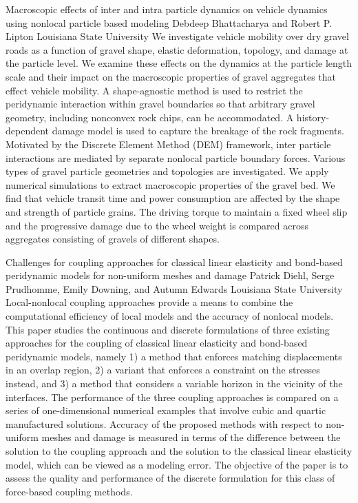 \vspace{1.5ex}
\abs
{Macroscopic effects of inter and intra particle dynamics on vehicle dynamics using nonlocal particle based modeling}
{Debdeep Bhattacharya and Robert P. Lipton}
{Louisiana State University}
{
We investigate vehicle mobility over dry gravel roads as a function of gravel shape, elastic deformation, topology, and damage at the particle level. We examine these effects on the dynamics at the particle length scale and their impact on the macroscopic properties of gravel aggregates that effect vehicle mobility.  A shape-agnostic method is used to restrict the peridynamic interaction within gravel boundaries so that arbitrary gravel geometry, including nonconvex rock chips, can be accommodated.  A history-dependent damage model is used to capture the breakage of the rock fragments.  Motivated by the Discrete Element Method (DEM) framework, inter particle interactions are mediated by separate nonlocal particle boundary forces.  Various types of gravel particle geometries and topologies are investigated. We apply numerical simulations to extract macroscopic properties of the gravel bed. We find that vehicle transit time and power consumption are affected by the shape and strength of particle grains.  The driving torque to maintain a fixed wheel slip and the progressive damage due to the wheel weight is compared across aggregates consisting of gravels of different shapes.
}


\vspace{1.5ex}
\abs
{Challenges for coupling approaches for classical linear elasticity and bond-based peridynamic models for non-uniform meshes and damage}
{Patrick Diehl, Serge Prudhomme, Emily Downing, and Autumn Edwards}
{Louisiana State University}
{Local-nonlocal coupling approaches provide a means to combine the computational efficiency of local models and the accuracy of nonlocal models. This paper studies the continuous and discrete formulations of three existing approaches for the coupling of classical linear elasticity and bond-based peridynamic models, namely 1) a method that enforces matching displacements in an overlap region, 2) a variant that enforces a constraint on the stresses instead, and 3) a method that considers a variable horizon in the vicinity of the interfaces. The performance of the three coupling approaches is compared on a series of one-dimensional numerical examples that involve cubic and quartic manufactured solutions. Accuracy of the proposed methods with respect to non-uniform meshes and damage is measured in terms of the difference between the solution to the coupling approach and the solution to the classical linear elasticity model, which can be viewed as a modeling error. The objective of the paper is to assess the quality and performance of the discrete formulation for this class of force-based coupling methods.
}
